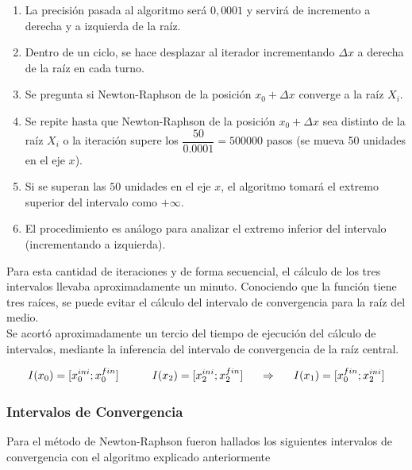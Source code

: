 \documentclass[10pt,a4paper]{article}
\begin{document}
\begin{enumerate}[label=\roman*]
    \item La precisión pasada al algoritmo será $0,0001$ y 
    servirá de incremento a derecha y a izquierda de la raíz.\\
    \item Dentro de un ciclo, se hace desplazar al iterador incrementando $\Delta x$ a derecha de la raíz en cada turno.\\
    \item Se pregunta si Newton-Raphson de la posición $x_{0}+\Delta x$ converge a la raíz $X_{i}$.\\
    \item Se repite hasta que Newton-Raphson de la posición $x_{0}+\Delta x$ sea distinto de la raíz $X_{i}$ o la iteración supere los $\dfrac{50}{0.0001}=500000$ pasos (se mueva 50 unidades en el eje $x$).\\
    \item Si se superan las $50$ unidades en el eje $x$, el algoritmo tomará el extremo superior del intervalo como $+\infty$. \\
    \item El procedimiento es análogo para analizar el extremo inferior del intervalo (incrementando a izquierda).\\
\end{enumerate}

Para esta cantidad de iteraciones y de forma secuencial, el cálculo de los tres intervalos llevaba aproximadamente un minuto. Conociendo que la función tiene tres raíces, se puede evitar el cálculo del intervalo de convergencia para la raíz del medio. \\

Se acortó aproximadamente un tercio del tiempo de ejecución del cálculo de intervalos, mediante la inferencia del intervalo de convergencia de la raíz central.

\begin{equation}
\notag I(x_{0})=[x_{0}^{ini};x_{0}^{fin}]\hspace{30pt} I(x_{2})=[x_{2}^{ini};x_{2}^{fin}]\hspace{15pt}\Rightarrow \hspace{15pt} I(x_{1})=[x_{0}^{fin};x_{2}^{ini}]
\end{equation}

\subsubsection{Intervalos de Convergencia}
Para el método de Newton-Raphson fueron hallados los siguientes intervalos de convergencia con el algoritmo explicado anteriormente\\
\end{document}

